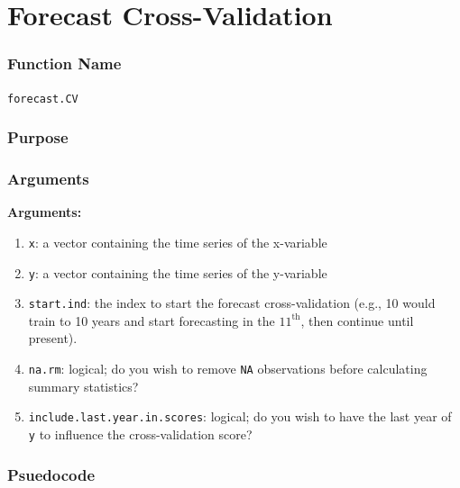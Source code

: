 \documentclass[12pt,]{book}
\providecommand{\tightlist}{%
  \setlength{\itemsep}{0pt}\setlength{\parskip}{0pt}}
\theoremstyle{definition}
\theoremstyle{definition}
\theoremstyle{definition}
\theoremstyle{remark}
\begin{document}
\section*{Forecast Cross-Validation}\label{forecast-cross-validation}

\subsubsection*{Function Name}\label{function-name}

\texttt{forecast.CV}

\subsubsection*{Purpose}\label{purpose}

\subsubsection*{Arguments}\label{arguments}

\noindent
\textbf{Arguments:}

\begin{enumerate}
\def\labelenumi{\arabic{enumi}.}
\tightlist
\item
  \texttt{x}: a vector containing the time series of the x-variable
\item
  \texttt{y}: a vector containing the time series of the y-variable
\item
  \texttt{start.ind}: the index to start the forecast cross-validation
  (e.g., 10 would train to 10 years and start forecasting in the
  \(11^{\text{th}}\), then continue until present).
\item
  \texttt{na.rm}: logical; do you wish to remove \texttt{NA}
  observations before calculating summary statistics?
\item
  \texttt{include.last.year.in.scores}: logical; do you wish to have the
  last year of \texttt{y} to influence the cross-validation score?
\end{enumerate}

\subsubsection*{Psuedocode}\label{psuedocode}
\end{document}
